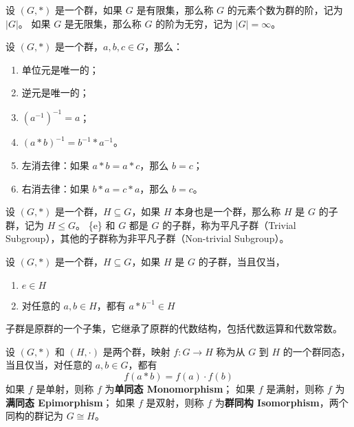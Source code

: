 \begin{definition}[群的阶]
    设 $(G, *)$ 是一个群，如果 $G$ 是有限集，那么称 $G$ 的元素个数为群的阶，记为 $|G|$。
    如果 $G$ 是无限集，那么称 $G$ 的阶为无穷，记为 $|G| = \infty$。
\end{definition}

\vspace{1em}

\begin{proposition}[群运算的性质]
    设 $(G, *)$ 是一个群，$a, b, c\in G$，那么：
    \begin{enumerate}
        \item 单位元是唯一的；
        \item 逆元是唯一的；
        \item $(a^{-1})^{-1} = a$；
        \item $(a * b)^{-1} = b^{-1} * a^{-1}$。
        \item 左消去律：如果 $a * b = a * c$，那么 $b = c$；
        \item 右消去律：如果 $b * a = c * a$，那么 $b = c$。
    \end{enumerate}
\end{proposition}
\vspace{1em}

\begin{definition}[子群 Subgroup]
    设 $(G, *)$ 是一个群，$H\subseteq G$，如果 $H$ 本身也是一个群，那么称 $H$ 是 $G$ 的子群，记为 $H \le G$。
    \{e\} 和 $G$ 都是 $G$ 的子群，称为平凡子群（Trivial Subgroup），其他的子群称为非平凡子群（Non-trivial Subgroup）。
    \label{def:subgroup}
\end{definition}

\begin{theorem}[子群判定定理]
    设 $(G, *)$ 是一个群，$H\subseteq G$，如果 $H$ 是 $G$ 的子群，当且仅当，
    \begin{enumerate}
        \item $e \in H$
        \item 对任意的 $a, b \in H$，都有 $a * b^{-1} \in H$
    \end{enumerate}
\end{theorem}
\begin{note}
    子群是原群的一个子集，它继承了原群的代数结构，包括代数运算和代数常数。
\end{note}
\vspace{1em}

\begin{definition}
    设 $(G, *)$ 和 $(H, \cdot)$ 是两个群，映射 $f: G \to H$ 称为从 $G$ 到 $H$ 的一个群同态，当且仅当，对任意的 $a, b\in G$，都有
    \[
        f(a * b) = f(a) \cdot f(b)
    \]
    如果 $f$ 是单射，则称 $f$ 为\textbf{单同态 Monomorphism}；
    如果 $f$ 是满射，则称 $f$ 为\textbf{满同态 Epimorphism}；
    如果 $f$ 是双射，则称 $f$ 为\textbf{群同构 Isomorphism}，两个同构的群记为 $G \cong H$。
    \label{def:group_homomorphism}
\end{definition}

